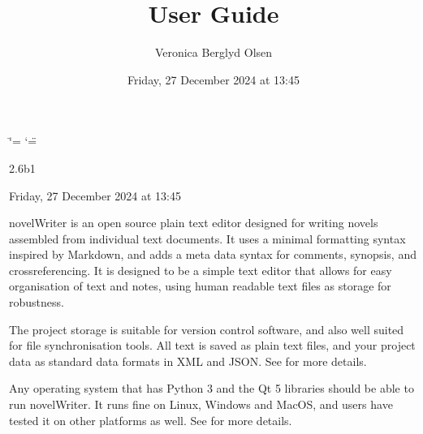 \documentclass[a4paper,11pt,english]{sphinxmanual}
\title{User Guide}
\date{Friday, 27 December 2024 at 13:45}
\author{Veronica Berglyd Olsen}
\let\sphinxpxdimen\pdfpxdimen\else\newdimen\sphinxpxdimen
\begin{document}
\ifdefined\shorthandoff
  \ifnum\catcode`\=\string=\active\shorthandoff{=}\fi
  \ifnum\catcode`\"=\active{}\fi
\fi

\pagestyle{empty}
\sphinxmaketitle
\pagestyle{plain}
\sphinxtableofcontents
\pagestyle{normal}
\label{\detokenize{index::doc}}


\begin{DUlineblock}{0em}
\item[]  2.6b1
\item[]  Friday, 27 December 2024 at 13:45
\end{DUlineblock}

\sphinxAtStartPar
novelWriter is an open source plain text editor designed for writing novels assembled from
individual text documents. It uses a minimal formatting syntax inspired by Markdown, and adds a
meta data syntax for comments, synopsis, and cross\sphinxhyphen{}referencing. It is designed to be a simple text
editor that allows for easy organisation of text and notes, using human readable text files as
storage for robustness.

\begin{figure}[htbp]
\centering

\noindent\sphinxincludegraphics[width=500\sphinxpxdimen]{{screenshot_multi}.png}
\end{figure}

\sphinxAtStartPar
The project storage is suitable for version control software, and also well suited for file
synchronisation tools. All text is saved as plain text files, and your project data as standard
data formats in XML and JSON. See {\hyperref[\detokenize{tech_storage:a-storage}]{}} for more details.

\sphinxAtStartPar
Any operating system that has Python 3 and the Qt 5 libraries should be able to run novelWriter.
It runs fine on Linux, Windows and MacOS, and users have tested it on other platforms as well.
See {\hyperref[\detokenize{int_started:a-started}]{}} for more details.
\end{document}
